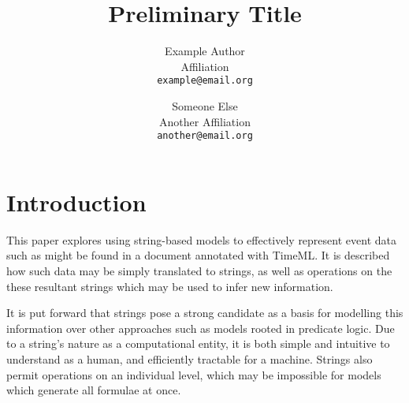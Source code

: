 \documentclass[a4paper,11pt]{article}
\title{Preliminary Title}
\date{}
\author{Example Author\\
	Affiliation\\
	\texttt{example@email.org}
	\and Someone Else\\
	Another Affiliation\\
	\texttt{another@email.org}
}
\begin{document}
\maketitle
\thispagestyle{empty}
\pagestyle{empty}

%

\section{Introduction}
This paper explores using string-based models to effectively represent event 
data such as might be found in a document annotated with TimeML. It is 
described how such data may be simply translated to strings, as well as 
operations on the these resultant strings which may be used to infer new 
information.

It is put forward that strings pose a strong candidate as a basis for modelling 
this information over other approaches such as models rooted in predicate 
logic. Due to a string's nature as a computational entity, it is both simple 
and intuitive to understand as a human, and efficiently tractable for a 
machine. Strings also permit operations on an individual level, which may be 
impossible for models which generate all formulae at once.
\end{document}
